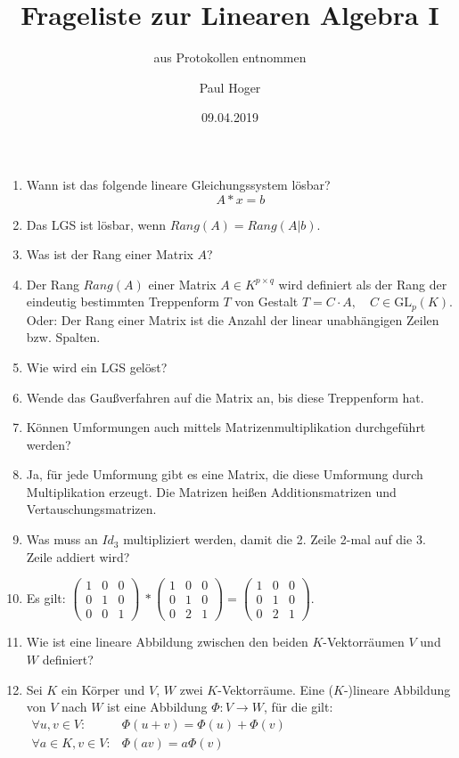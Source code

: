 \documentclass[11pt,parskip=full]{scrartcl}
\title{Frageliste zur Linearen Algebra I}
\subtitle{aus Protokollen entnommen}
\date{09.04.2019}
\author{Paul Hoger}
\newcommand{\answer}{\item[\textbf{Antwort}]}
\begin{document}
	\maketitle
	
	\begin{enumerate}[label=\textbf{\arabic*. Frage}]
		
		\item Wann ist das folgende lineare Gleichungssystem lösbar?
		\begin{equation*}
			A*x = b
		\end{equation*}
		\answer Das LGS ist lösbar, wenn \(Rang(A) = Rang(A|b)\).
		
		\item Was ist der Rang einer Matrix $A$?
		\answer Der Rang \(Rang(A)\) einer Matrix \(A \in K^{p \times q}\) wird definiert als der Rang der eindeutig bestimmten Treppenform \(T\) von Gestalt \(T=C \cdot A, \quad C \in \mathrm{GL}_{p}(K)\). \\
		Oder: Der Rang einer Matrix ist die Anzahl der linear unabhängigen Zeilen bzw. Spalten.
		
		\item Wie wird ein LGS gelöst?
		\answer Wende das Gaußverfahren auf die Matrix an, bis diese Treppenform hat.
		
		\item Können Umformungen auch mittels Matrizenmultiplikation durchgeführt werden?
		\answer Ja, für jede Umformung gibt es eine Matrix, die diese Umformung durch Multiplikation erzeugt. Die Matrizen heißen Additionsmatrizen und Vertauschungsmatrizen.
			
		\item Was muss an $Id_{3}$ multipliziert werden, damit die 2. Zeile 2-mal auf die 3. Zeile addiert wird?
		\answer Es gilt: 
		\(\begin{pmatrix}
			1 & 0 & 0 \\
			0 & 1 & 0 \\	
			0 & 0 & 1
		\end{pmatrix}\ * \begin{pmatrix}1 & 0 & 0 \\0 & 1 & 0 \\ 0 & 2 & 1\end{pmatrix} = \begin{pmatrix}1 & 0 & 0 \\0 & 1 & 0 \\ 0 & 2 & 1\end{pmatrix}\).
		
		\item Wie ist eine lineare Abbildung zwischen den beiden $K$-Vektorräumen $V$ und $W$ definiert?
		\answer Sei $K$ ein Körper und $V$, $W$ zwei $K$-Vektorräume. Eine ($K$-)lineare Abbildung von $V$ nach $W$ ist eine Abbildung \(\Phi : V \rightarrow W\), für die gilt: \\
		\(\begin{aligned} \forall u, v \in V : & \Phi(u+v)=\Phi(u)+\Phi(v) \\ \forall a \in K, v \in V : & \Phi(a v)=a \Phi(v) \end{aligned}\)
		

\end{enumerate}
\end{document}
